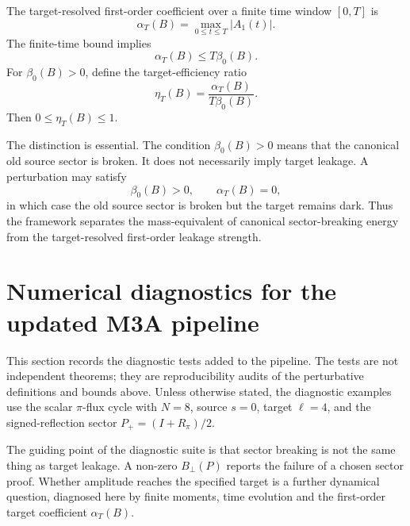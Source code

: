 \documentclass[11pt]{article}
\theoremstyle{definition}
\begin{document}
The target-resolved first-order coefficient over a finite time window $[0,T]$ is
\[
\alpha_T(B)=\max_{0\le t\le T}|A_1(t)|.
\]
The finite-time bound implies
\[
\alpha_T(B)\le T\beta_0(B).
\]
For $\beta_0(B)>0$, define the target-efficiency ratio
\[
\eta_T(B)=\frac{\alpha_T(B)}{T\beta_0(B)}.
\]
Then $0\le\eta_T(B)\le1$.

The distinction is essential. The condition $\beta_0(B)>0$ means that the canonical old source sector is broken. It does not necessarily imply target leakage. A perturbation may satisfy
\[
\beta_0(B)>0,
\qquad \alpha_T(B)=0,
\]
in which case the old source sector is broken but the target remains dark. Thus the framework separates the mass-equivalent of canonical sector-breaking energy from the target-resolved first-order leakage strength.

\section{Numerical diagnostics for the updated M3A pipeline}
This section records the diagnostic tests added to the pipeline. The tests are not independent theorems; they are reproducibility audits of the perturbative definitions and bounds above. Unless otherwise stated, the diagnostic examples use the scalar $\pi$-flux cycle with $N=8$, source $s=0$, target $\ell=4$, and the signed-reflection sector $P_+=(I+R_\pi)/2$.

The guiding point of the diagnostic suite is that sector breaking is not the same thing as target leakage. A non-zero $B_\perp(P)$ reports the failure of a chosen sector proof. Whether amplitude reaches the specified target is a further dynamical question, diagnosed here by finite moments, time evolution and the first-order target coefficient $\alpha_T(B)$.
\end{document}
